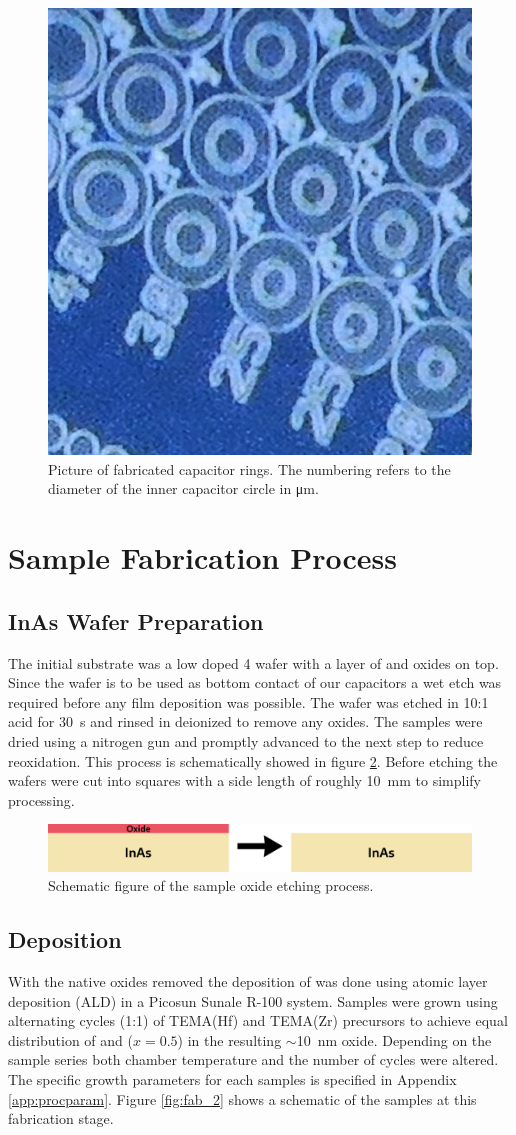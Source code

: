\documentclass[11pt,twoside]{eitExjobb}
\begin{document}
\begin{figure}[htbp]
    \centering
    \includegraphics[width=.30\linewidth]{fig/img/babycomputers.jpg}
    \caption{Picture of fabricated capacitor rings. The numbering refers to the
    diameter of the inner capacitor circle in
    \si{\micro\meter}.}\label{fig:fab_babycomp}
\end{figure}

\section{Sample Fabrication Process}\label{sec:FabProc}

\subsection{InAs Wafer Preparation}
The initial substrate was a low doped  \SI{4}{\inch} wafer with a
layer of  and  oxides on top. Since the wafer is to be used as
bottom contact of our capacitors a wet etch was required before any film
deposition was possible. The wafer was etched in 10:1  acid for
\SI{30}{\second} and rinsed in deionized  to remove any oxides. The
samples were dried using a nitrogen gun and promptly advanced to the next step
to reduce reoxidation. This process is schematically showed in figure
\ref{fig:fab_1}. Before etching the wafers were cut into squares with a side
length of roughly \SI{10}{\milli\meter} to simplify processing.

\begin{figure}[htbp]
    \centering
    \includegraphics[width=.70\linewidth]{fig/fabproc/fab_1.png}
    \caption{Schematic figure of the sample oxide etching process.}\label{fig:fab_1}
\end{figure}

\subsection{ Deposition}
With the native  oxides removed the deposition of 
was done using atomic layer deposition (ALD) in a Picosun Sunale R-100 system.
Samples were grown using alternating cycles (1:1) of TEMA(Hf) and TEMA(Zr)
precursors to achieve equal distribution of  and  ($x=0.5$) in
the resulting $\sim$\SI{10}{\nano\meter} oxide. Depending on the sample series
both chamber temperature and the number of cycles were altered. The specific
growth parameters for each samples is specified in Appendix \ref{app:procparam}.
Figure \ref{fig:fab_2} shows a schematic of the samples at this fabrication
stage.
\end{document}
